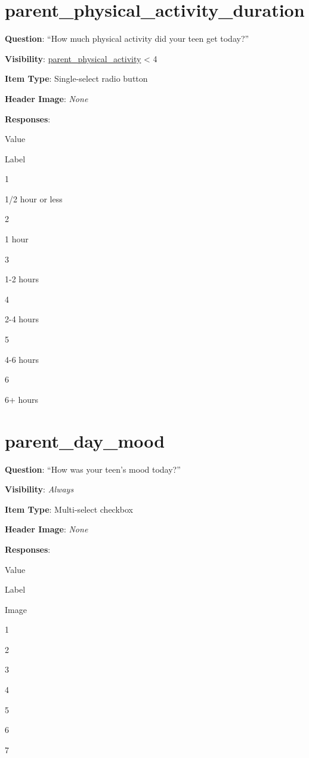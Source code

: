 \documentclass[]{book}
\begin{document}
\hypertarget{parent_physical_activity_duration}{%
\section{parent\_physical\_activity\_duration}\label{parent_physical_activity_duration}}

\textbf{Question}: ``How much physical activity did your teen get today?''

\textbf{Visibility}: \protect\hyperlink{parent_physical_activity}{parent\_physical\_activity} \textless{} 4

\textbf{Item Type}: Single-select radio button

\textbf{Header Image}: \emph{None}

\textbf{Responses}:

Value

Label

1

1/2 hour or less

2

1 hour

3

1-2 hours

4

2-4 hours

5

4-6 hours

6

6+ hours

\hypertarget{parent_day_mood}{%
\section{parent\_day\_mood}\label{parent_day_mood}}

\textbf{Question}: ``How was your teen's mood today?''

\textbf{Visibility}: \emph{Always}

\textbf{Item Type}: Multi-select checkbox

\textbf{Header Image}: \emph{None}

\textbf{Responses}:

Value

Label

Image

1

2

3

4

5

6

7
\end{document}
